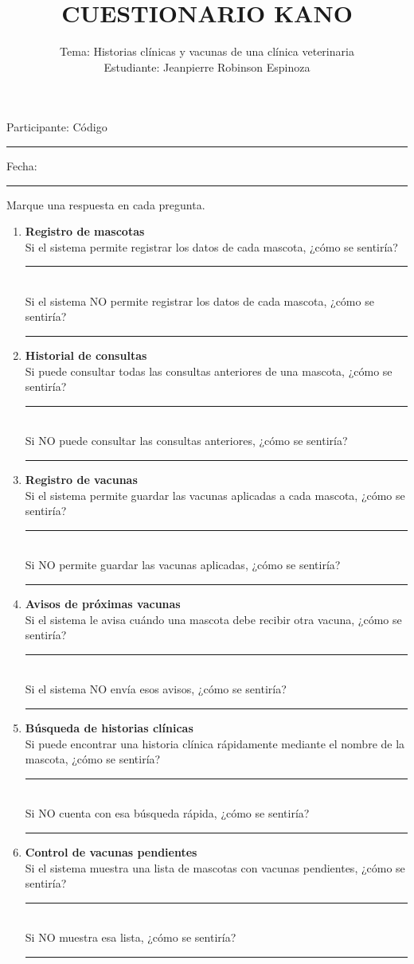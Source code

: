 \documentclass[11pt,a4paper]{article}
\title{\textbf{CUESTIONARIO KANO}}
\author{Tema: Historias clínicas y vacunas de una clínica veterinaria\\
Estudiante: Jeanpierre Robinson Espinoza}
\date{}
\begin{document}
\maketitle

\noindent Participante: Código \rule{2.5cm}{0.4pt}\quad Fecha: \rule{2.5cm}{0.4pt}

\noindent Marque una respuesta en cada pregunta.

\begin{enumerate}[leftmargin=*, label=\textbf{\arabic*}.]

  \item \textbf{Registro de mascotas}\\
  Si el sistema permite registrar los datos de cada mascota, ¿cómo se sentiría? \rule{1.2cm}{0.4pt}\\
  Si el sistema NO permite registrar los datos de cada mascota, ¿cómo se sentiría? \rule{1.2cm}{0.4pt}

  \item \textbf{Historial de consultas}\\
  Si puede consultar todas las consultas anteriores de una mascota, ¿cómo se sentiría? \rule{1.2cm}{0.4pt}\\
  Si NO puede consultar las consultas anteriores, ¿cómo se sentiría? \rule{1.2cm}{0.4pt}

  \item \textbf{Registro de vacunas}\\
  Si el sistema permite guardar las vacunas aplicadas a cada mascota, ¿cómo se sentiría? \rule{1.2cm}{0.4pt}\\
  Si NO permite guardar las vacunas aplicadas, ¿cómo se sentiría? \rule{1.2cm}{0.4pt}

  \item \textbf{Avisos de próximas vacunas}\\
  Si el sistema le avisa cuándo una mascota debe recibir otra vacuna, ¿cómo se sentiría? \rule{1.2cm}{0.4pt}\\
  Si el sistema NO envía esos avisos, ¿cómo se sentiría? \rule{1.2cm}{0.4pt}

  \item \textbf{Búsqueda de historias clínicas}\\
  Si puede encontrar una historia clínica rápidamente mediante el nombre de la mascota, ¿cómo se sentiría? \rule{1.2cm}{0.4pt}\\
  Si NO cuenta con esa búsqueda rápida, ¿cómo se sentiría? \rule{1.2cm}{0.4pt}

  \item \textbf{Control de vacunas pendientes}\\
  Si el sistema muestra una lista de mascotas con vacunas pendientes, ¿cómo se sentiría? \rule{1.2cm}{0.4pt}\\
  Si NO muestra esa lista, ¿cómo se sentiría? \rule{1.2cm}{0.4pt}


\end{enumerate}
\end{document}
